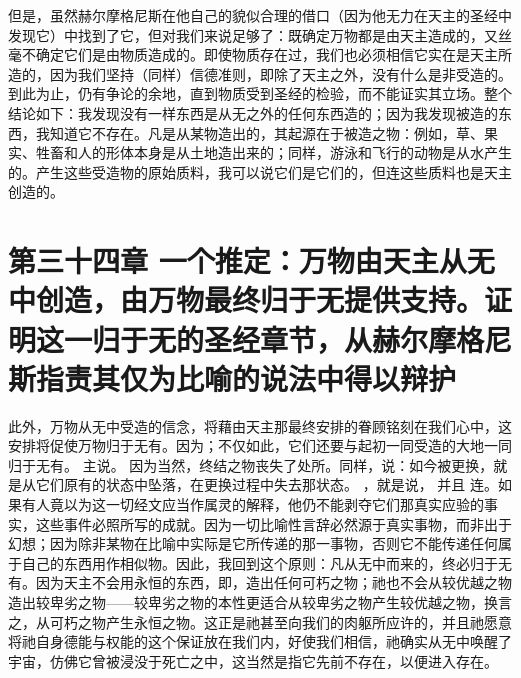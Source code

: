 但是，虽然赫尔摩格尼斯在他自己的貌似合理的借口（因为他无力在天主的圣经中发现它）中找到了它，但对我们来说足够了：既确定万物都是由天主造成的，又丝毫不确定它们是由物质造成的。即使物质存在过，我们也必须相信它实在是天主所造的，因为我们坚持（同样）信德准则，即除了天主之外，没有什么是非受造的。到此为止，仍有争论的余地，直到物质受到圣经的检验，而不能证实其立场。整个结论如下：我发现没有一样东西是从无之外的任何东西造的；因为我发现被造的东西，我知道它不存在。凡是从某物造出的，其起源在于被造之物：例如，草、果实、牲畜和人的形体本身是从土地造出来的；同样，游泳和飞行的动物是从水产生的。产生这些受造物的原始质料，我可以说它们是它们的，但连这些质料也是天主创造的。\par


\section{第三十四章 一个推定：万物由天主从无中创造，由万物最终归于无提供支持。证明这一归于无的圣经章节，从赫尔摩格尼斯指责其仅为比喻的说法中得以辩护}

此外，万物从无中受造的信念，将藉由天主那最终安排的眷顾铭刻在我们心中，这安排将促使万物归于无有。因为；不仅如此，它们还要与起初一同受造的大地一同归于无有。  主说。    因为当然，终结之物丧失了处所。同样，说：如今被更换，就是从它们原有的状态中坠落，在更换过程中失去那状态。  ，就是说，    并且   连。如果有人竟以为这一切经文应当作属灵的解释，他仍不能剥夺它们那真实应验的事实，这些事件必照所写的成就。因为一切比喻性言辞必然源于真实事物，而非出于幻想；因为除非某物在比喻中实际是它所传递的那一事物，否则它不能传递任何属于自己的东西用作相似物。因此，我回到这个原则：凡从无中而来的，终必归于无有。因为天主不会用永恒的东西，即，造出任何可朽之物；祂也不会从较优越之物造出较卑劣之物——较卑劣之物的本性更适合从较卑劣之物产生较优越之物，换言之，从可朽之物产生永恒之物。这正是祂甚至向我们的肉躯所应许的，并且祂愿意将祂自身德能与权能的这个保证放在我们内，好使我们相信，祂确实从无中唤醒了宇宙，仿佛它曾被浸没于死亡之中，这当然是指它先前不存在，以便进入存在。\par

